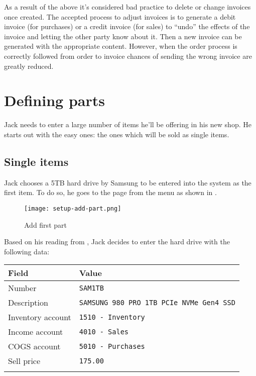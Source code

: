 As a result of the above it's considered bad practice to delete or change invoices once
created. The accepted process to adjust invoices is to generate a debit invoice (for purchases)
or a credit invoice (for sales) to ``undo'' the effects of the invoice and letting the other party
know about it. Then a new invoice can be generated with the appropriate content. However,
when the order process is correctly followed from order to invoice chances of sending the wrong
invoice are greatly reduced.

\section{Defining parts}
\label{sec-stock-parts}

Jack needs to enter a large number of items he'll be offering in his new shop. He starts out
with the easy ones: the ones which will be sold as single items.

\subsection{Single items}
\label{subsec-stock-parts-single-item}

Jack chooses a 5TB hard drive by Samsung to be entered into the system as the first item.
To do so, he goes to the  page from the menu
as shown in .

\begin{figure}[h]
        \texttt{[image: setup-add-part.png]}
        \caption{Add first part}
        \label{fig:setup-add-part}
\end{figure}

Based on his reading from , Jack decides to enter the hard
drive with the following data:

\begin{tabular}{ll}
Field & Value\\ \hline
Number & \texttt{SAM1TB}\\
Description & \texttt{SAMSUNG 980 PRO 1TB PCIe NVMe Gen4 SSD} \\
Inventory account &  \texttt{1510 - Inventory}\\
Income account &  \texttt{4010 - Sales}\\
COGS account &  \texttt{5010 - Purchases}\\
Sell price &  \texttt{175.00}\\
\\
\end{tabular}

